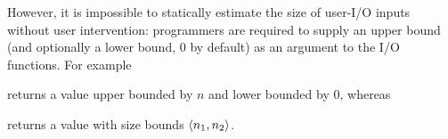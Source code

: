 However, it is impossible to statically estimate the size of user-I/O inputs without user intervention: programmers are required to supply an upper bound (and optionally a lower bound, \( 0 \) by default) as an argument to the I/O functions. For example  returns a value upper bounded by \( n \) and lower bounded by \( 0 \), whereas  returns a value with size bounds \( \bound{n_1}{n_2} \).

\vspace{5mm}

\hspace*{-2.8cm}\begin{minipage}{.5\paperwidth}
  \begin{prooftree}
  \end{prooftree}
\end{minipage}%
\hspace*{-1.2cm}\begin{minipage}{.5\paperwidth}
  \begin{prooftree}
  \end{prooftree}
\end{minipage}

\begin{prooftree}
\end{prooftree}

\begin{prooftree}
\end{prooftree}

